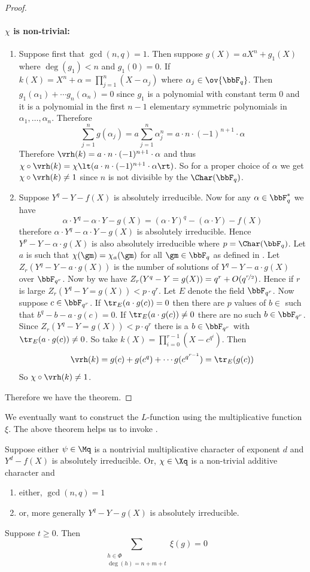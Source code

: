 \begin{proof}
  \paragraph*{$\chi$ is non-trivial:} \begin{enumerate}[label=(\roman*)]
    \item Suppose first that $\gcd(n,q)=1$. Then suppose $g(X)=aX^n+g_1(X)$ where $\deg(g_1)<n$ and $g_1(0)=0$. If $k(X)=X^n+\alpha=\prod_{j=1}^n(X-\alpha_j)$ where $\alpha_j\in\ov{\bbF_q}$. Then $g_1(\alpha_1)+\cdots g_n(\alpha_n)=0$ since $g_1$ is a polynomial with constant term $0$ and it is a polynomial in the first $n-1$ elementary symmetric polynomials in $\alpha_1,\dots, \alpha_n$. Therefore $$\sum_{j=1}^ng(\alpha_j)=a\sum_{j=1}^n\alpha_j^n=a\cdot n\cdot (-1)^{n+1}\cdot \alpha$$Therefore $\vrh(k)=a\cdot n\cdot (-1)^{n+1}\cdot \alpha$ and thus $\chi\circ\vrh(k)=\chi\lt(a\cdot n\cdot (-1)^{n+1}\cdot \alpha\rt)$. So for a proper choice of $\alpha$ we get $\chi\circ\vrh(k)\neq 1$ since $n$ is not divisible by the $\Char(\bbF_q)$.
    \item Suppose $Y^q-Y-f(X)$ is absolutely irreducible. Now for any $\alpha\in\bbF_q^*$ we have $$\alpha\cdot Y^q-\alpha\cdot Y-g(X)=(\alpha\cdot Y)^q-(\alpha\cdot Y)-f(X)$$ therefore $\alpha\cdot Y^q-\alpha\cdot Y-g(X)$ is absolutely irreducible. Hence $Y^p-Y-\alpha\cdot g(X)$ is also absolutely irreducible where $p=\Char(\bbF_q)$. Let $a$ is such that $\chi(\gm)=\chi_a(\gm)$ for all $\gm\in\bbF_q$ as defined in \AddCharDefthm. Let $Z_r(Y^q-Y-a\cdot g(X))$ is the number of solutions of $Y^q-Y-a\cdot g(X)$ over $\bbF_{q^r}$. Now by  we have $Z_r(Y^q-Y=g(X))=q^r+O(q^{\nicefrac{r}2})$. Hence if $r$ is large $Z_r(Y^q-Y=g(X))<p\cdot q^r$. Let $E$ denote the field $\bbF_{q^r}$. Now suppose $c\in \bbF_{q^r}$. If $\tr_{E}(a\cdot g(c))=0$ then there are $p$ values of $b\in $ such that $b^q-b-a\cdot g(c)=0$. If $\tr_E(a\cdot g(c))\neq 0$ there are no such $b\in\bbF_{q^r}$. Since $Z_r(Y^q-Y=g(X))<p\cdot q^r$ there is a $b\in\bbF_{q^r}$ with $\tr_E(a\cdot g(c))\neq 0$. So take $k(X)=\prod_{i=0}^{r-1}(X-c^{q^i})$. Then $$\vrh(k)=g(c)+g(c^q)+\cdots g(c^{q^{r-1}})=\tr_E(g(c))$$So $\chi\circ \vrh(k)\neq 1$. 
  \end{enumerate} 
  Therefore we have the theorem. 
\end{proof}
We eventually want to construct the $L$-function using the multiplicative function $\xi$. The above theorem helps us to invoke \LFactthm. 
\begin{lemma}{}{}
  Suppose either $\psi\in\Mq$ is a nontrivial multiplicative character of exponent $d$ and $Y^d-f(X)$ is absolutely irreducible. Or, $\chi\in\Xq$ is a non-trivial additive character and 
  \begin{enumerate}[label=(\roman*)]
    \item either, $\gcd(n,q)=1$ 
    \item or, more generally $Y^q-Y-g(X)$ is absolutely irreducible.
  \end{enumerate}
  Suppose $t\geq 0$. Then $$\sum_{\substack{h\in \Phi\\ \deg(h)=n+m+t}}\xi(g)=0$$
\end{lemma}
